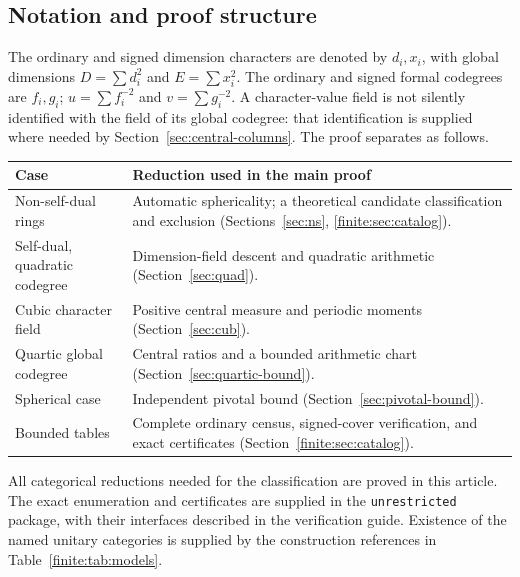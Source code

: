 \subsection*{Notation and proof structure}
The ordinary and signed dimension characters are denoted by $d_i,x_i$,
with global dimensions $D=\sum d_i^2$ and $E=\sum x_i^2$.
The ordinary and signed formal codegrees are $f_i,g_i$;
$u=\sum f_i^{-2}$ and $v=\sum g_i^{-2}$.
A character-value field is not silently identified with the field of
its global codegree: that identification is supplied where needed by
Section~\ref{sec:central-columns}. The proof separates as follows.
\begin{center}\small
\begin{tabular}{p{}p{}}
\toprule
Case&Reduction used in the main proof\\
\midrule
Non-self-dual rings&Automatic sphericality; a theoretical candidate
classification and exclusion (Sections~\ref{sec:ns}, \ref{finite:sec:catalog}).\\
Self-dual, quadratic codegree&Dimension-field descent and quadratic
arithmetic (Section~\ref{sec:quad}).\\
Cubic character field&Positive central measure and periodic moments
(Section~\ref{sec:cub}).\\
Quartic global codegree&Central ratios and a bounded arithmetic chart
(Section~\ref{sec:quartic-bound}).\\
Spherical case&Independent pivotal bound (Section~\ref{sec:pivotal-bound}).\\
Bounded tables&Complete ordinary census, signed-cover verification,
and exact certificates (Section~\ref{finite:sec:catalog}).\\
\bottomrule
\end{tabular}
\end{center}
All categorical reductions needed for the classification are proved in
this article. The exact enumeration and certificates are supplied in the
\texttt{unrestricted} package, with their interfaces described in the
verification guide. Existence of the named unitary categories is supplied
by the construction references in Table~\ref{finite:tab:models}.

